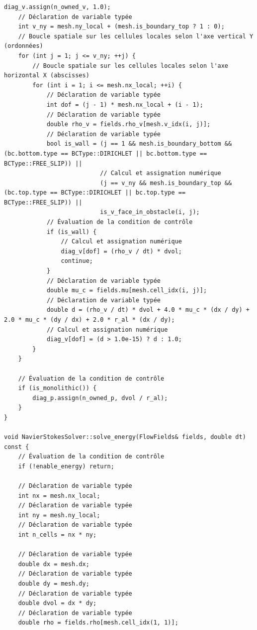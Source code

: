 \documentclass[10pt,a4paper,oneside]{book}
\begin{document}
\begin{lstlisting}[language={[11]C++}]
    diag_v.assign(n_owned_v, 1.0);
    // Déclaration de variable typée
    int v_ny = mesh.ny_local + (mesh.is_boundary_top ? 1 : 0);
    // Boucle spatiale sur les cellules locales selon l'axe vertical Y (ordonnées)
    for (int j = 1; j <= v_ny; ++j) {
        // Boucle spatiale sur les cellules locales selon l'axe horizontal X (abscisses)
        for (int i = 1; i <= mesh.nx_local; ++i) {
            // Déclaration de variable typée
            int dof = (j - 1) * mesh.nx_local + (i - 1);
            // Déclaration de variable typée
            double rho_v = fields.rho_v[mesh.v_idx(i, j)];
            // Déclaration de variable typée
            bool is_wall = (j == 1 && mesh.is_boundary_bottom && (bc.bottom.type == BCType::DIRICHLET || bc.bottom.type == BCType::FREE_SLIP)) ||
                           // Calcul et assignation numérique
                           (j == v_ny && mesh.is_boundary_top && (bc.top.type == BCType::DIRICHLET || bc.top.type == BCType::FREE_SLIP)) ||
                           is_v_face_in_obstacle(i, j);
            // Évaluation de la condition de contrôle
            if (is_wall) {
                // Calcul et assignation numérique
                diag_v[dof] = (rho_v / dt) * dvol;
                continue;
            }
            // Déclaration de variable typée
            double mu_c = fields.mu[mesh.cell_idx(i, j)];
            // Déclaration de variable typée
            double d = (rho_v / dt) * dvol + 4.0 * mu_c * (dx / dy) + 2.0 * mu_c * (dy / dx) + 2.0 * r_al * (dx / dy);
            // Calcul et assignation numérique
            diag_v[dof] = (d > 1.0e-15) ? d : 1.0;
        }
    }

    // Évaluation de la condition de contrôle
    if (is_monolithic()) {
        diag_p.assign(n_owned_p, dvol / r_al);
    }
}

void NavierStokesSolver::solve_energy(FlowFields& fields, double dt) const {
    // Évaluation de la condition de contrôle
    if (!enable_energy) return;

    // Déclaration de variable typée
    int nx = mesh.nx_local;
    // Déclaration de variable typée
    int ny = mesh.ny_local;
    // Déclaration de variable typée
    int n_cells = nx * ny;

    // Déclaration de variable typée
    double dx = mesh.dx;
    // Déclaration de variable typée
    double dy = mesh.dy;
    // Déclaration de variable typée
    double dvol = dx * dy;
    // Déclaration de variable typée
    double rho = fields.rho[mesh.cell_idx(1, 1)];


\end{lstlisting}
\end{document}
